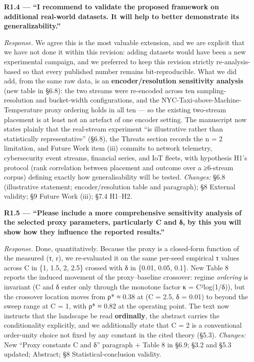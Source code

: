 \documentclass[
  11pt,
]{article}
\begin{document}
\textbf{R1.4 --- ``I recommend to validate the proposed framework on
additional real-world datasets. It will help to better demonstrate its
generalizability.''}

\emph{Response.} We agree this is the most valuable extension, and we
are explicit that we have not done it within this revision: adding
datasets would have been a new experimental campaign, and we preferred
to keep this revision strictly re-analysis-based so that every published
number remains bit-reproducible. What we did add, from the same raw
data, is an \textbf{encoder/resolution sensitivity analysis} (new table
in §6.8): the two streams were re-encoded across ten sampling-resolution
and bucket-width configurations, and the
NYC-Taxi-above-Machine-Temperature proxy ordering holds in all ten ---
so the existing two-stream placement is at least not an artefact of one
encoder setting. The manuscript now states plainly that the real-stream
experiment ``is illustrative rather than statistically representative''
(§6.8), the Threats section records the n = 2 limitation, and Future
Work item (iii) commits to network telemetry, cybersecurity event
streams, financial series, and IoT fleets, with hypothesis H1's protocol
(rank correlation between placement and outcome over a ≥6-stream corpus)
defining exactly how generalisability will be tested. \emph{Changes:}
§6.8 (illustrative statement; encoder/resolution table and paragraph);
§8 External validity; §9 Future Work (iii); §7.4 H1--H2.

\textbf{R1.5 --- ``Please include a more comprehensive sensitivity
analysis of the selected proxy parameters, particularly C and δ, by this
you will show how they influence the reported results.''}

\emph{Response.} Done, quantitatively. Because the proxy is a
closed-form function of the measured (τ, r), we re-evaluated it on the
same per-seed empirical τ values across C in \{1, 1.5, 2, 2.5\} crossed
with δ in \{0.01, 0.05, 0.1\}. New Table 8 reports the induced movement
of the proxy--baseline crossover: regime \emph{ordering} is invariant (C
and δ enter only through the monotone factor κ = C²log(1/δ)), but the
crossover location moves from ρ* ≈ 0.38 at (C = 2.5, δ = 0.01) to beyond
the sweep range at C = 1, with ρ* ≈ 0.82 at the operating point. The
text now instructs that the landscape be read \textbf{ordinally}, the
abstract carries the conditionality explicitly, and we additionally
state that C = 2 is a conventional order-unity choice not fixed by any
constant in the cited theory (§5.3). \emph{Changes:} New ``Proxy
constants C and δ'' paragraph + Table 8 in §6.9; §3.2 and §5.3 updated;
Abstract; §8 Statistical-conclusion validity.
\end{document}
